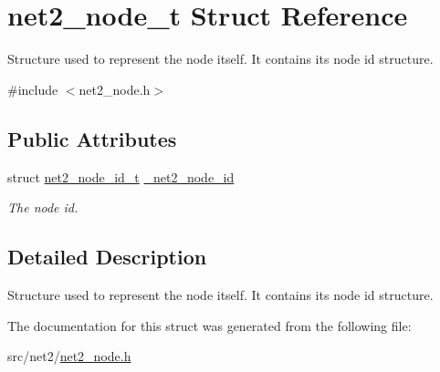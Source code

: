 \hypertarget{structnet2__node__t}{\section{net2\-\_\-node\-\_\-t Struct Reference}
\label{structnet2__node__t}
}


Structure used to represent the node itself. It contains its node id structure.  




{\ttfamily \#include $<$net2\-\_\-node.\-h$>$}

\subsection*{Public Attributes}
\begin{DoxyCompactItemize}
\item 
\hypertarget{structnet2__node__t_a9ff8fd051476d5c5d9c46d8ee3fbe466}{struct \hyperlink{structnet2__node__id__t}{net2\-\_\-node\-\_\-id\-\_\-t} \hyperlink{structnet2__node__t_a9ff8fd051476d5c5d9c46d8ee3fbe466}{\-\_\-net2\-\_\-node\-\_\-id}}\label{structnet2__node__t_a9ff8fd051476d5c5d9c46d8ee3fbe466}

\begin{DoxyCompactList}\small\item\em The node id. \end{DoxyCompactList}\end{DoxyCompactItemize}


\subsection{Detailed Description}
Structure used to represent the node itself. It contains its node id structure. 

The documentation for this struct was generated from the following file\-:\begin{DoxyCompactItemize}
\item 
src/net2/\hyperlink{net2__node_8h}{net2\-\_\-node.\-h}\end{DoxyCompactItemize}
